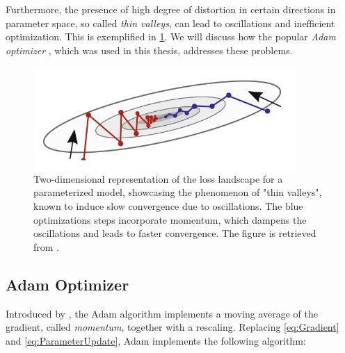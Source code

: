 Furthermore, the presence of high degree of distortion in certain directions in parameter space, so called  \emph{thin valleys}, can lead to oscillations and inefficient optimization. This is exemplified in \cref{fig:thinValley}. We will discuss how the popular \emph{Adam optimizer} \cite{kingma2017adam}, which was used in this thesis, addresses these problems.

\begin{figure}[htp]
    \centering
    \includegraphics[width=10cm]{latex/figures/thin_vally.png}
    \caption{Two-dimensional representation of the loss landscape for a parameterized model, showcasing the phenomenon of "thin valleys", known to induce slow convergence due to oscillations. The blue optimizations steps incorporate momentum, which dampens the oscillations and leads to faster convergence. The figure is retrieved from \citet{SupervisedwquantumComputers}.}
    \label{fig:thinValley}
\end{figure}



\subsection{Adam Optimizer}\label{sec:AdamOptimizer}
Introduced by \citet{kingma2017adam}, the Adam algorithm implements a moving average of the gradient, called \emph{momentum}, together with a rescaling. Replacing \cref{eq:Gradient} and \cref{eq:ParameterUpdate}, Adam implements the following algorithm:

